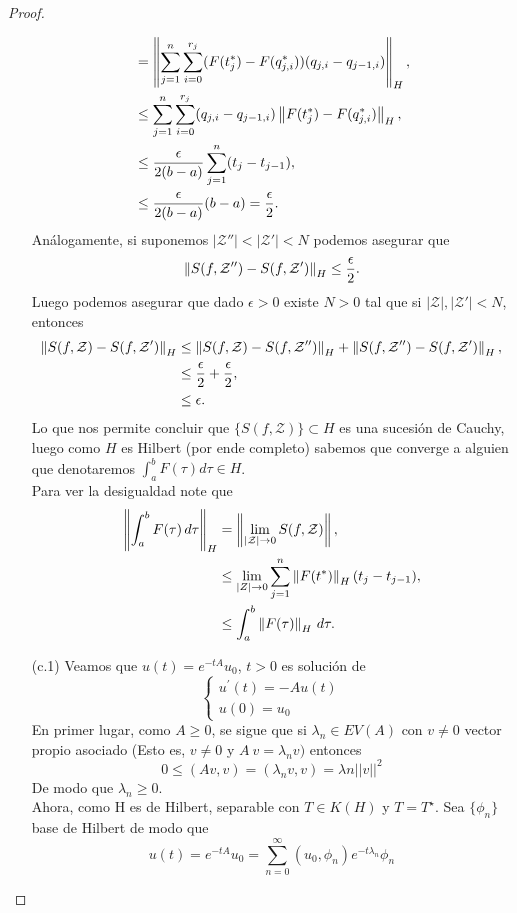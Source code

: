 \begin{proof}
\begin{enumerate}
\begin{align*}
      &=\left\|\sum_{j=1}^{n}\sum_{i=0}^{r_{j}}(F(t^{*}_{j})-F(q^{*}_{j,i}))(q_{j,i}-q_{j-1,i})\right\|_{H},\\
      &\leq \sum_{j=1}^{n}\sum_{i=0}^{r_{j}}(q_{j,i}-q_{j-1,i})\left\|F(t^{*}_{j})-F(q^{*}_{j,i})\right\|_{H},\\
      &\leq \frac{\epsilon}{2(b-a)} \sum_{j=1}^{n}(t_{j}-t_{j-1}),\\
      &\leq \frac{\epsilon}{2(b-a)} (b-a)=\frac{\epsilon}{2}.
    \end{align*}
    Análogamente, si suponemos $|\mathcal{Z}''|<|\mathcal{Z}'|<N$ podemos asegurar que
    \begin{align*}
      \left\|S(f,\mathcal{Z}'')-S(f,\mathcal{Z}')\right\|_{H}\leq \frac{\epsilon}{2}.
    \end{align*}
    Luego podemos asegurar que dado $\epsilon>0$ existe $N>0$ tal que si $|\mathcal{Z}|,|\mathcal{Z}'|<N$, entonces
    \begin{align*}
      \left\|S(f,\mathcal{Z})-S(f,\mathcal{Z}')\right\|_{H}&\leq\left\|S(f,\mathcal{Z})-S(f,\mathcal{Z}'')\right\|_{H}+\left\|S(f,\mathcal{Z''})-S(f,\mathcal{Z}')\right\|_{H},\\
      &\leq \frac{\epsilon}{2}+\frac{\epsilon}{2},\\
      &\leq \epsilon.
    \end{align*}
    Lo que nos permite concluir que $\{S(f,\mathcal{Z})\}\subset H$ es una sucesión de Cauchy, luego como $H$ es Hilbert (por ende completo) sabemos que converge a alguien que denotaremos $\int_{a}^{b}F(\tau)d\tau\in H$.\\
    Para ver la desigualdad note que
    \begin{align*}
      \left\|\int_{a}^{b}F(\tau)\, d\tau\right\|_{H}&=\left\|\lim_{|\mathcal{Z}| \to 0}S(f,\mathcal{Z})\right\|,\\
      &\leq \lim_{|Z| \to 0}\sum_{j=1}^{n}\left\|F(t^{*})\right\|_{H}(t_{j}-t_{j-1}),\\
      &\leq \int_{a}^{b}\left\|F(\tau)\right\|_{H}\, d\tau.
    \end{align*}
  \item[(c.1)]Veamos que $u(t)=e^{-tA}u_{0}$, $t>0$ es solución de
\[
\begin{cases}
u^{\prime}(t)=-Au(t)\\
u(0)=u_{0}
\end{cases}
\]
En primer lugar, como $A\ge0$, se sigue que si $\lambda_n \in EV(A)$ con $v\ne0$ vector propio asociado (Esto es, $v\ne 0$ y $A~v=\lambda_{n}v)$ entonces
\[0\le(Av,v)=(\lambda_{n}v,v)=\lambda n||v||^{2}\]
De modo que $\lambda_{n}\ge0$. \\
Ahora, como H es de Hilbert, separable con $T\in K(H)$ y $T=T^{\star}$. Sea $\{\phi_n\}$ base de Hilbert de modo que
\[u(t)=e^{-tA}u_{0}=\sum_{n=0}^{\infty}(u_{0},\phi_{n})e^{-t\lambda_{n}}\phi_{n}\]


\end{enumerate}
\end{proof}
